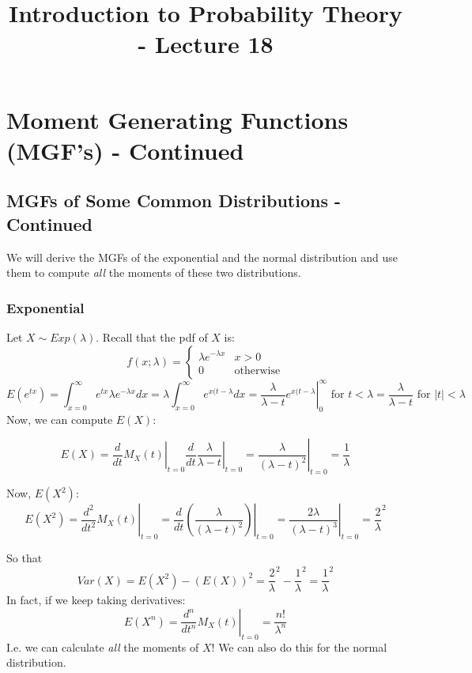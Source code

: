\documentclass[12pt]{article} %
\date{}
\title{Introduction to Probability Theory - Lecture 18}
\begin{document}
\maketitle

\section{Moment Generating Functions (MGF's) - Continued}

\subsection{MGFs of Some Common Distributions - Continued}
We will derive the MGFs of the exponential and the normal distribution and use them to compute \emph{all} the moments of these two distributions.
\subsubsection*{Exponential}
Let $X\sim Exp(\lambda)$.
Recall that the pdf of $X$ is:
$$f(x;\lambda) = \left\{\begin{matrix}
\lambda e^{-\lambda x} & x>0\\
0&\textrm{otherwise}
\end{matrix}\right.$$
$$E(e^{tx}) = \int_{x=0}^\infty  e^{tx}\lambda e^{-\lambda x} dx = \lambda  \int_{x=0}^\infty  e^{x(t-\lambda} dx = \left.\frac{\lambda}{\lambda -t} e^{x(t-\lambda}\right\rvert_0^\infty \textrm{ for } t<\lambda = \frac{\lambda}{\lambda - t} \textrm{ for } |t|<\lambda$$
Now, we can compute $E(X)$:

$$E(X) = \left.\frac{d}{dt}M_X(t)\right\rvert_{t=0}\left.\frac{d}{dt}\frac{\lambda}{\lambda - t} \right\rvert_{t=0} = \left.\frac{\lambda}{(\lambda - t)^2}\right\rvert_{t=0} = \frac1\lambda$$

Now, $E(X^2)$:
$$E(X^2) = \left.\frac{d^2}{dt^2}M_X(t)\right\rvert_{t=0} = \left.\frac{d}{dt}\left(\frac{\lambda}{(\lambda - t)^2}\right)\right\rvert_{t=0} = \left.\frac{2\lambda}{(\lambda - t)^3}\right\rvert_{t=0} = \frac2\lambda^2$$

So that 
$$Var(X) = E(X^2) - \left(E(X)\right)^2 = \frac2\lambda^2 - \frac1\lambda^2 = \frac1\lambda^2$$
In fact, if we keep taking derivatives:
$$E(X^n) =\left.\frac{d^n}{dt^n}M_X(t)\right\rvert_{t=0} = \frac{n!}{\lambda^n}$$
I.e. we can calculate \emph{all} the moments of $X$! We can also do this for the normal distribution.
\end{document}
